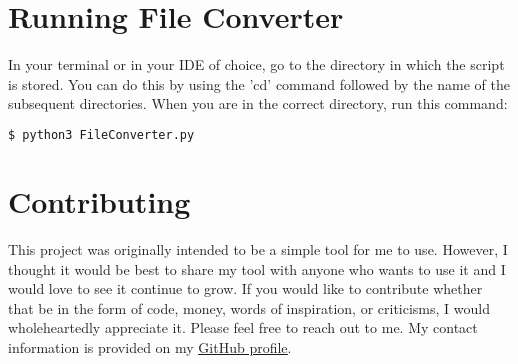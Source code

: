 \documentclass[
	a4paper, %
	12pt, %
]{CSSullivanBusinessReport}
\begin{document}
\begin{fullwidth}
\section{Running File Converter}
In your terminal or in your IDE of choice, go to the directory in which the script is stored. You can do this by using the 'cd' command followed by the name of the subsequent directories. When you are in the correct directory, run this command:

\begin{lstlisting}[language=bash]
	$ python3 FileConverter.py
	\end{lstlisting}
	
\section{Contributing}
This project was originally intended to be a simple tool for me to use. However, I thought it would be best to share my tool with anyone who wants to use it and I would love to see it continue to grow. If you would like to contribute whether that be in the form of  code, money, words of inspiration, or criticisms, I would wholeheartedly appreciate it. Please feel free to reach out to me. My contact information is  provided on my \href{https://github.com/MaybeMarq}{\underline{GitHub profile}}.

\newpage

\end{fullwidth}





\printbibliography
\end{document}
